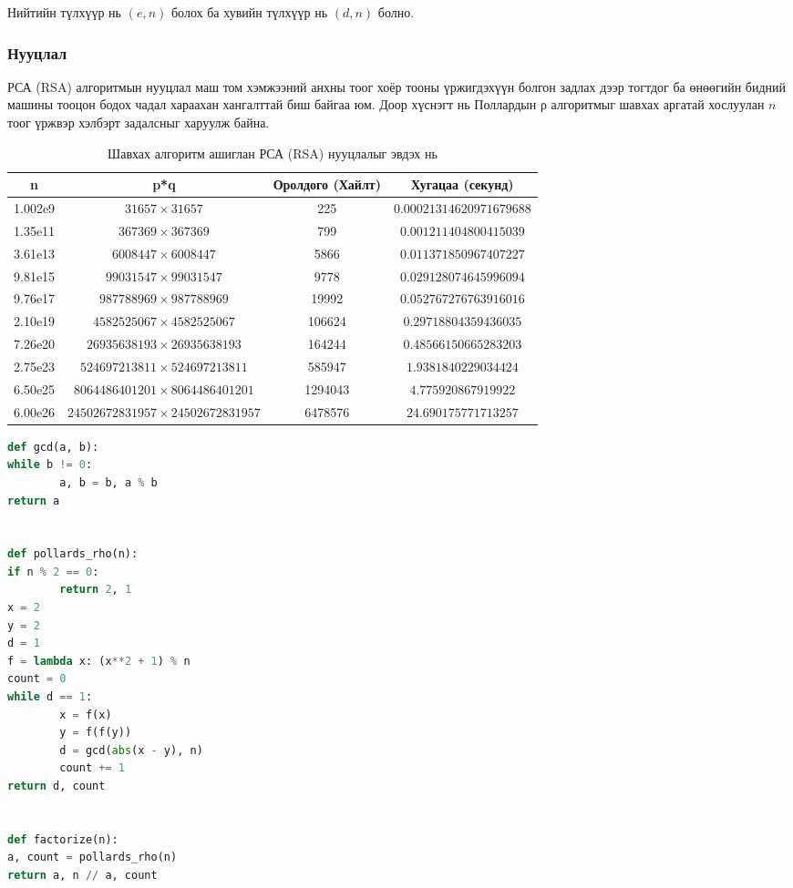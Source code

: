 	Нийтийн түлхүүр нь $(e, n)$ болох ба хувийн түлхүүр нь $(d, n)$ болно.\cite{РСА (RSA)}
	
\subsubsection{Нууцлал}
РСА (RSA) алгоритмын нууцлал маш том хэмжээний анхны тоог хоёр тооны үржигдэхүүн болгон задлах дээр тогтдог ба өнөөгийн бидний машины тооцон бодох чадал хараахан хангалттай биш байгаа юм. Доор хүснэгт нь Поллардын ρ алгоритмыг шавхах аргатай хослуулан $n$ тоог үржвэр хэлбэрт задалсныг харуулж байна.
\begin{table}[h!]
	\centering
	\caption{Шавхах алгоритм ашиглан РСА (RSA) нууцлалыг эвдэх нь}
	\begin{tabular}{|c|c|c|c|}
	\hline
	n & p*q & Оролдого (Хайлт) & Хугацаа (секунд) \\
	\hline
	1.002e9 & $31657 \times 31657$ & 225 & $0.00021314620971679688$ \\
	1.35e11 & $367369 \times 367369$ & 799 & $0.001211404800415039$ \\
	3.61e13 & $6008447 \times 6008447$ & 5866 & $0.011371850967407227$ \\
	9.81e15 & $99031547 \times 99031547$ & 9778 & $0.029128074645996094$ \\
	9.76e17 & $987788969 \times 987788969$ & 19992 & $0.052767276763916016$ \\
	2.10e19 & $4582525067 \times 4582525067$ & 106624 & $0.29718804359436035$ \\
	7.26e20 & $26935638193 \times 26935638193$ & 164244 & $0.48566150665283203$ \\
	2.75e23 & $524697213811 \times 524697213811$ & 585947 & $1.9381840229034424$ \\
	6.50e25 & $8064486401201 \times 8064486401201$ & 1294043 & $4.775920867919922$ \\
	6.00e26 & $24502672831957 \times 24502672831957$ & 6478576 & $24.690175771713257$ \\
	\hline
	\end{tabular}
	\end{table}

\begin{lstlisting}[language=Python, caption=Поллардын ρ алгоритмын хэрэгжүүлэлт, frame=single]
def gcd(a, b):
while b != 0:
		a, b = b, a % b
return a


def pollards_rho(n):
if n % 2 == 0:
		return 2, 1
x = 2
y = 2
d = 1
f = lambda x: (x**2 + 1) % n
count = 0
while d == 1:
		x = f(x)
		y = f(f(y))
		d = gcd(abs(x - y), n)
		count += 1
return d, count


def factorize(n):
a, count = pollards_rho(n)
return a, n // a, count
\end{lstlisting}

